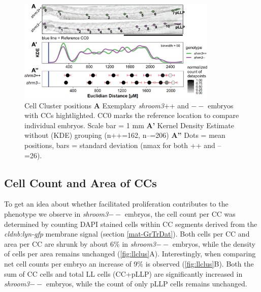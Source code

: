 \documentclass[11pt,singlespacinge,twoside]{reedthesis} %
\begin{document}
\begin{figure}

{\centering \includegraphics[width=0.85\textwidth]{figures/results/01_morphometrics/ll_positions} 

}

\caption[Cell Cluster Positions]{Cell Cluster positions \textbf{A} Exemplary \emph{shroom3}++ and \(--\) embryos with CCs hightlighted. CC0 marks the reference location to compare individual embryos. Scale bar = 1 mm \textbf{A'} Kernel Density Estimate without (KDE) grouping (n++=162, n--=206) \textbf{A''} Dots = mean positions, bars = standard deviation (nmax for both ++ and -- =26).}\label{fig:llpos}
\end{figure}
\hypertarget{res-llmorph}{%
\subsection{Cell Count and Area of CCs}\label{res-llmorph}}

To get an idea about whether facilitated proliferation contributes to the phenotype we observe in \emph{shroom3}\(--\) embryos, the cell count per CC was determined by counting DAPI stained cells within CC segments derived from the \emph{cldnb:lyn-gfp} membrane signal (section \ref{mat-GrTrDat}). Both cells per CC and area per CC are shrunk by about 6\% in \emph{shroom3}\(--\) embryos, while the density of cells per area remains unchanged (\ref{fig:llclus}A). Interestingly, when comparing net cell counts per embryo an increase of 9\% is observed (\ref{fig:llclus}B). Both the sum of CC cells and total LL cells (CC+pLLP) are significantly increased in \emph{shroom3}\(--\) embryos, while the count of only pLLP cells remains unchanged.
\end{document}
